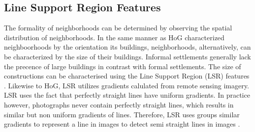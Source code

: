 \subsection{Line Support Region Features}

The formality of neighborhoods can be determined by observing the spatial
distribution of neighborhoods. In the same manner as HoG characterized
neighboorhoods by the orientation its buildings, neighborhoods, alternatively,
can be characterized by the size of their buildings. Informal settlements
generally lack the precence of large buildings in contrast with formal
settlements. The size of constructions can be characterised using the Line
Support Region (LSR) features \cite{unsalan2004classifying}. Likewise to HoG, LSR utilizes gradients
calulated from remote sensing imagery. LSR uses the fact that perfectly
straight lines have uniform gradients. In practice however, photographs never
contain perfectly straight lines, which results in similar but non uniform
gradients of lines. Therefore, LSR uses groups similar gradients to represent
a line in images to detect semi straight lines in images \cite{burns1986extracting}.


